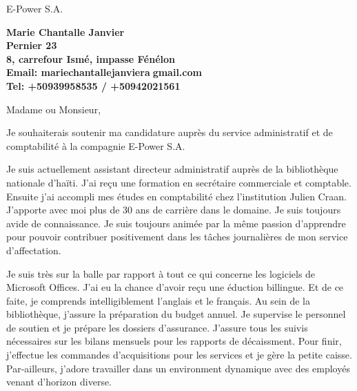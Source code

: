 \documentclass[11pt]{letter} %
\begin{document}

\begin{letter}{E-Power S.A.} 


\begin{center}
\large\bf Marie Chantalle Janvier\\ %
Pernier 23 \\
8, carrefour Ism\'{e}, impasse F\'{e}n\'{e}lon\\  %
Email: mariechantallejanvier\textcircled{a}gmail.com \\
Tel: +50939958535 / +50942021561
\end{center} 
\vfill

\signature{Marie Chantalle Janvier} %


\opening{Madame ou Monsieur,} 
 
Je souhaiterais soutenir ma candidature aupr\`{e}s du service administratif et de comptabilit\'{e} \`{a} la compagnie E-Power S.A. 

Je suis actuellement assistant directeur administratif aupr\`{e}s de la biblioth\`{e}que nationale d'ha\"{i}ti. J'ai re\c{c}u une formation en secr\'{e}taire commerciale et comptable. Ensuite j'ai accompli mes \'{e}tudes en comptabilit\'{e} chez l'institution Julien Craan. J'apporte avec moi plus de 30 ans de carri\`{e}re dans le domaine. Je suis toujours avide de connaissance. Je suis toujours anim\'{e}e par la m\^{e}me passion d'apprendre pour pouvoir contribuer positivement dans les t\^{a}ches journali\`{e}res de mon service d'affectation. 

Je suis tr\`{e}s sur la balle par rapport \`{a} tout ce qui concerne les logiciels de Microsoft Offices. J'ai eu la chance d'avoir re\c{c}u une \'{e}duction billingue. Et de ce faite, je comprends intelligiblement l'anglais et le fran\c{c}ais. Au sein de la biblioth\`{e}que, j'assure la pr\'{e}paration du budget annuel. Je supervise le personnel de soutien et je pr\'{e}pare les dossiers d'assurance. J'assure tous les suivis n\'{e}cessaires sur les bilans mensuels pour les rapports de d\'{e}caissment. Pour finir, j'effectue les commandes d'acquisitions pour les services et je g\`{e}re la petite caisse. Par-ailleurs, j'adore travailler dans un environment dynamique avec des employ\'{e}s venant d'horizon diverse.


\end{letter}
\end{document}
